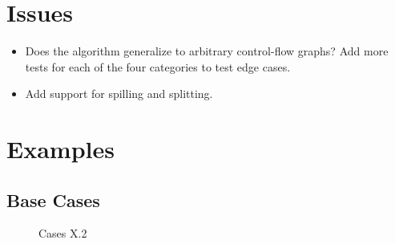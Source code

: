 \documentclass[12pt]{article}
\begin{document}
\pagebreak

\section{Issues}

\begin{itemize}
  \item
    Does the algorithm generalize to arbitrary control-flow graphs?
    Add more tests for each of the four categories to test edge cases.
  \item 
    Add support for spilling and splitting.
\end{itemize}

\section{Examples}

\subsection{Base Cases}

\begin{figure}[h!]
  \centering
   \hfill
  \caption{Cases X.2}
\end{figure}
\end{document}
